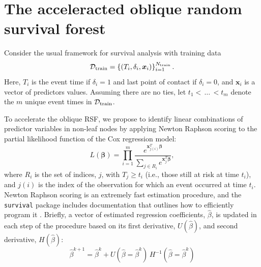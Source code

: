 \documentclass[twoside,11pt]{article}\usepackage[]{graphicx}\usepackage[]{xcolor}
\newcommand{\dataset}{{\cal D}}
\begin{document}

\section{The acceleracted oblique random survival forest}

Consider the usual framework for survival analysis with training data $$\dataset_{\text{train}} = \left\{ (T_i, \delta_i, \bm{x}_{i}) \right\}_{i=1}^{N_{\text{train}}}.$$ Here, $T_i$ is the event time if $\delta_i=1$ and last point of contact if $\delta_i=0$, and $\bm{x}_i$ is a vector of predictors values. Assuming there are no ties, let $t_1 < \, \ldots \, < t_m$ denote the $m$ unique event times in $\dataset_{\text{train}}$.

To accelerate the oblique RSF, we propose to identify linear combinations of predictor variables in non-leaf nodes by applying Newton Raphson scoring to the partial likelihood function of the Cox regression model:
\begin{equation}\label{eqn:cox-partial-likelihood}
L(\bm\beta) = \prod_{i=1}^m \frac{e^{\bm{x}_{j(i)}^T \bm\beta}}{\sum_{j \in R_i} e^{\bm{x}_j^T \bm\beta}},
\end{equation}
where $R_i$ is the set of indices, $j$, with $T_j \geq t_i$ (i.e., those still at risk at time $t_i$), and $j(i)$ is the index of the observation for which an event occurred at time $t_i$. Newton Raphson scoring is an extremely fast estimation procedure, and the \texttt{survival} package includes documentation that outlines how to efficiently program it \citep{therneau_survival_2022}. Briefly, a vector of estimated regression coefficients, $\hat{\beta}$, is updated in each step of the procedure based on its first derivative, $U(\hat{\beta})$, and second derivative, $H(\hat{\beta})$:
$$ \hat{\beta}^{k+1} =  \hat{\beta}^{k} + U(\hat{\beta} = \hat{\beta}^{k})\, H^{-1}(\hat{\beta} = \hat{\beta}^{k}) $$
\end{document}
